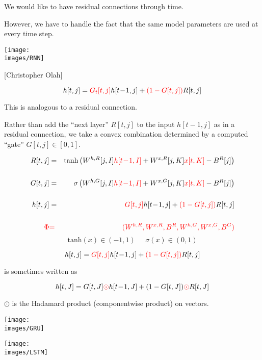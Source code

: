 {\vfill
We would like to have residual connections through time.

\vfill
However, we have to handle the fact that the same model parameters are used at every time step.



\centerline{\texttt{[image: \\images/RNN]}}
\centerline{{\large [Christopher Olah]}}

$$h[t,j] =  {\color{red} G_t[t,j]}h[t\!-\!1,j] + {\color{red} (1-G[t,j])}R[t,j]$$

\vfill
This is analogous to a residual connection.

\vfill
Rather than add the ``next layer'' $R[t,j]$ to the input $h[t\!-\!1,j]$ as in a residual connection, we take a convex combination determined by a computed ``gate'' $G[t,j] \in [0,1]$.


{\huge
\begin{eqnarray*}
R[t,j] & = & \mathrm{tanh}\left(W^{h,R}[j,I]{\color{red} h[t\!-\!1,I]} + W^{x,R}[j,K]{\color{red} x[t,K]} - B^R[j]\right) \\
\\
G[t,j] & = & \sigma\left(W^{h,G}[j,I]{\color{red} h[t\!-\!1,I]} + W^{x,G}[j,K]{\color{red} x[t,K]} - B^R[j]\right) \\
\\
h[t,j] & = & {\color{red} G[t,j]}h[t\!-\!1,j] + {\color{red} (1-G[t,j])}R[t,j] \\
\\
{\color{red} \Phi} & {\color{red} =} & {\color{red} (W^{h,R},W^{x,R},B^R,W^{h,G},W^{x,G},B^G)}
\end{eqnarray*}
}
$$\mathrm{tanh}(x) \in (-1,1)\;\;\;\;\;\sigma(x) \in (0,1)$$


$$h[t,j] =  {\color{red} G[t,j]}h[t\!-\!1,j] + {\color{red} (1-G[t,j])}R[t,j]$$

\vfill
is sometimes written as

$$h[t,J] =  G[t,J]{\color{red} \odot} h[t\!-\!1,J] + (1-G[t,J]){\color{red} \odot} R[t,J]$$

\vfill
$\odot$ is the Hadamard product (componentwise product) on vectors.


\centerline{\texttt{[image: \\images/GRU]}}

\centerline{\texttt{[image: \\images/LSTM]}}

}
